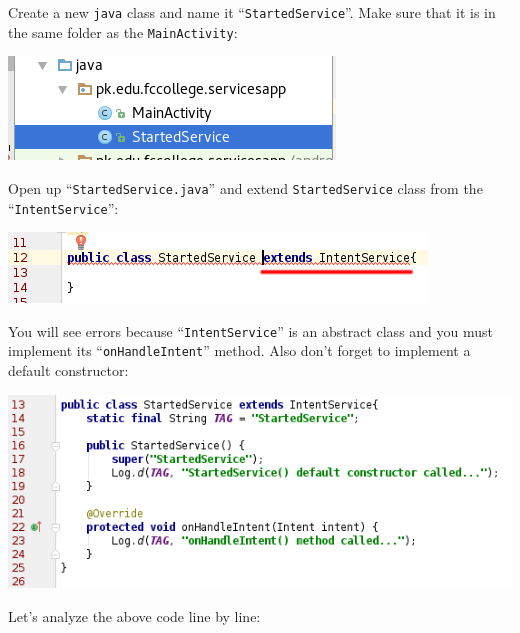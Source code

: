 Create a new \texttt{java} class and name it ``\texttt{StartedService}''. Make sure that it is in the same folder as the \texttt{MainActivity}:

\begin{center}
	\includegraphics[scale=\SourceCodeScale]{chapters/ch14/images/2}
\end{center}

Open up ``\texttt{StartedService.java}'' and extend \texttt{StartedService} class from the ``\texttt{IntentService}'':

\begin{center}
	\includegraphics[scale=\SourceCodeScale]{chapters/ch14/images/3}
\end{center}

You will see errors because ``\texttt{IntentService}'' is an abstract class and you must implement its ``\texttt{onHandleIntent}'' method. Also don't forget to implement a default constructor:

\begin{center}
	\includegraphics[scale=\SourceCodeScale]{chapters/ch14/images/4}
\end{center}

Let's analyze the above code line by line:

